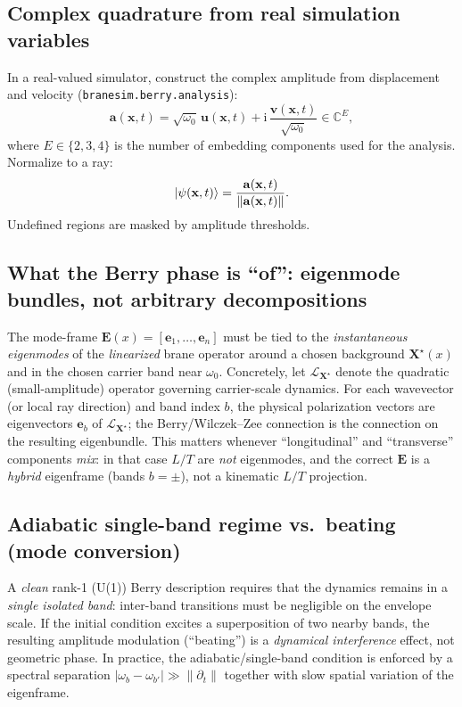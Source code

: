 \documentclass[11pt,a4paper]{article}
\newcommand{\C}{\mathbb{C}}
\providecommand{\ii}{\mathrm{i}}
\newcommand{\X}{\mathbf{X}}                 %
\newcommand{\x}{\mathbf{x}}                 %
\newcommand{\uvec}{\mathbf{u}}              %
\newcommand{\vvec}{\mathbf{v}}              %
\begin{document}
\subsection{Complex quadrature from real simulation variables}
In a real-valued simulator, construct the complex amplitude from displacement and velocity
(\texttt{branesim.berry.analysis}):
\begin{equation}
\mathbf{a}(\x,t) = \sqrt{\omega_0}\,\uvec(\x,t) + \ii\,\frac{\vvec(\x,t)}{\sqrt{\omega_0}}
\in \C^{E},
\label{eq:complex_amp}
\end{equation}
where \(E\in\{2,3,4\}\) is the number of embedding components used for the analysis.
Normalize to a ray:
\[
\ket{\psi(\x,t)} = \frac{\mathbf{a}(\x,t)}{\|\mathbf{a}(\x,t)\|}.
\]
Undefined regions are masked by amplitude thresholds.

\subsection{What the Berry phase is ``of'': eigenmode bundles, not arbitrary decompositions}
The mode-frame $\mathbf{E}(x)=[\mathbf{e}_1,\dots,\mathbf{e}_n]$ must be tied to the \emph{instantaneous eigenmodes}
of the \emph{linearized} brane operator around a chosen background $\X^\star(x)$ and in the chosen carrier band near $\omega_0$.
Concretely, let $\mathcal{L}_{\X^\star}$ denote the quadratic (small-amplitude) operator governing carrier-scale dynamics.
For each wavevector (or local ray direction) and band index $b$, the physical polarization vectors are eigenvectors
$\mathbf{e}_b$ of $\mathcal{L}_{\X^\star}$; the Berry/Wilczek--Zee connection is the connection on the resulting eigenbundle.
This matters whenever ``longitudinal'' and ``transverse'' components \emph{mix}: in that case $L/T$ are \emph{not} eigenmodes,
and the correct $\mathbf{E}$ is a \emph{hybrid} eigenframe (bands $b=\pm$), not a kinematic $L/T$ projection.

\subsection{Adiabatic single-band regime vs.\ beating (mode conversion)}
A \emph{clean} rank-1 (U(1)) Berry description requires that the dynamics remains in a \emph{single isolated band}:
inter-band transitions must be negligible on the envelope scale. If the initial condition excites a superposition of two nearby
bands, the resulting amplitude modulation (``beating'') is a \emph{dynamical interference} effect, not geometric phase.
In practice, the adiabatic/single-band condition is enforced by a spectral separation
$|\omega_b-\omega_{b'}|\gg \|\partial_t\|$ together with slow spatial variation of the eigenframe.
\end{document}
